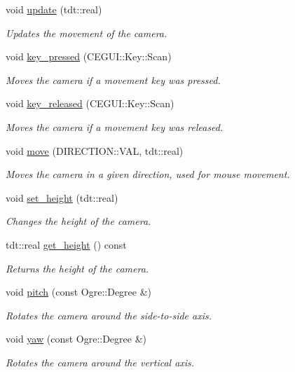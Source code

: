 \begin{DoxyCompactItemize}
void \hyperlink{class_camera_a643abf766752b1ac87ccadf012f97a0a}{update} (tdt\+::real)
\begin{DoxyCompactList}\small\item\em Updates the movement of the camera. \end{DoxyCompactList}\item 
void \hyperlink{class_camera_a90965d8c49dd607024c9746f3b58709d}{key\+\_\+pressed} (C\+E\+G\+U\+I\+::\+Key\+::\+Scan)
\begin{DoxyCompactList}\small\item\em Moves the camera if a movement key was pressed. \end{DoxyCompactList}\item 
void \hyperlink{class_camera_a1b10287c63e826afd3a92ba3d2cc183e}{key\+\_\+released} (C\+E\+G\+U\+I\+::\+Key\+::\+Scan)
\begin{DoxyCompactList}\small\item\em Moves the camera if a movement key was released. \end{DoxyCompactList}\item 
void \hyperlink{class_camera_a9c5d8b3c9536959b6cf7d64a272903bb}{move} (D\+I\+R\+E\+C\+T\+I\+O\+N\+::\+V\+AL, tdt\+::real)
\begin{DoxyCompactList}\small\item\em Moves the camera in a given direction, used for mouse movement. \end{DoxyCompactList}\item 
void \hyperlink{class_camera_a7e6994e657a5261708bf10915917fbcf}{set\+\_\+height} (tdt\+::real)
\begin{DoxyCompactList}\small\item\em Changes the height of the camera. \end{DoxyCompactList}\item 
tdt\+::real \hyperlink{class_camera_aa81c361011aedca6052a628029c4d422}{get\+\_\+height} () const 
\begin{DoxyCompactList}\small\item\em Returns the height of the camera. \end{DoxyCompactList}\item 
void \hyperlink{class_camera_aab2a0949e1dcdc92f1ba32f6edcb194c}{pitch} (const Ogre\+::\+Degree \&)
\begin{DoxyCompactList}\small\item\em Rotates the camera around the side-\/to-\/side axis. \end{DoxyCompactList}\item 
void \hyperlink{class_camera_ac48d23d230089a006ffd5e3ec154358b}{yaw} (const Ogre\+::\+Degree \&)
\begin{DoxyCompactList}\small\item\em Rotates the camera around the vertical axis. \end{DoxyCompactList}\end{DoxyCompactItemize}
